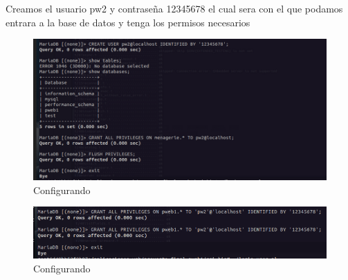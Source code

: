 Creamos el usuario pw2 y contraseña 12345678 el cual sera con el que podamos entrara a la base de datos y tenga los permisos necesarios
\begin{figure}[H]
  \centering
  \includegraphics[width=1.0\textwidth]{img/Creamos_usuario_MariaDB.png}
  \caption{Configurando}
\end{figure}
\begin{figure}[H]
  \centering
  \includegraphics[width=1.0\textwidth]{img/Dando_Permisos.png}
  \caption{Configurando}
\end{figure}

